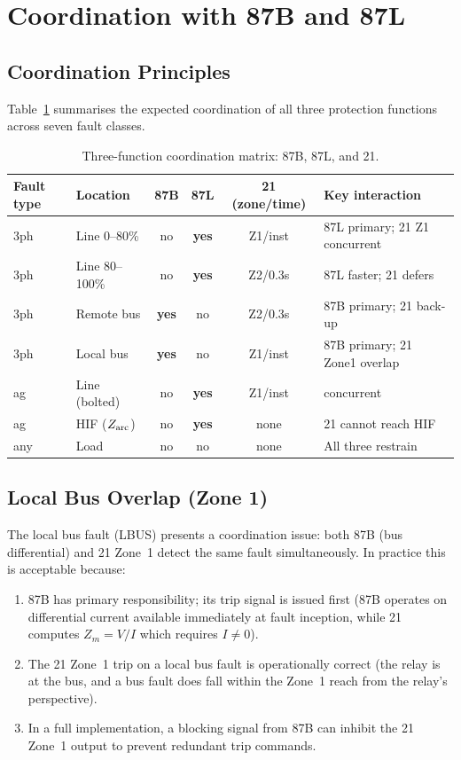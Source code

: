 \documentclass[11pt, a4paper]{article}
\begin{document}
\section{Coordination with 87B and 87L}
\label{sec:coord}

\subsection{Coordination Principles}

Table~\ref{tab:coord} summarises the expected coordination of all three
protection functions across seven fault classes.

\begin{table}[h]
  \centering
  \caption{Three-function coordination matrix: 87B, 87L, and 21.}
  \label{tab:coord}
  \setlength{\tabcolsep}{5pt}
  \begin{tabular}{llcccl}
    \toprule
    Fault type & Location & 87B & 87L & 21 (zone/time) & Key interaction \\
    \midrule
    3ph & Line 0--80\%    & no  & \textbf{yes} & Z1/inst & 87L primary; 21 Z1 concurrent \\
    3ph & Line 80--100\%  & no  & \textbf{yes} & Z2/0.3s & 87L faster; 21 defers \\
    3ph & Remote bus      & \textbf{yes} & no  & Z2/0.3s & 87B primary; 21 back-up \\
    3ph & Local bus       & \textbf{yes} & no  & Z1/inst & 87B primary; 21 Zone1 overlap \\
    ag  & Line (bolted)   & no  & \textbf{yes} & Z1/inst & concurrent \\
    ag  & HIF ($Z_{\rm arc}$) & no & \textbf{yes} & none & 21 cannot reach HIF \\
    any & Load            & no  & no  & none    & All three restrain \\
    \bottomrule
  \end{tabular}
\end{table}

\subsection{Local Bus Overlap (Zone 1)}

The local bus fault (LBUS) presents a coordination issue: both 87B (bus
differential) and 21 Zone~1 detect the same fault simultaneously.  In
practice this is acceptable because:

\begin{enumerate}
  \item 87B has primary responsibility; its trip signal is issued first
        (87B operates on differential current available immediately at
        fault inception, while 21 computes $Z_m = V/I$ which requires
        $I \neq 0$).
  \item The 21 Zone~1 trip on a local bus fault is operationally correct
        (the relay is at the bus, and a bus fault does fall within the
        Zone~1 reach from the relay's perspective).
  \item In a full implementation, a blocking signal from 87B can inhibit
        the 21 Zone~1 output to prevent redundant trip commands.
\end{enumerate}
\end{document}

